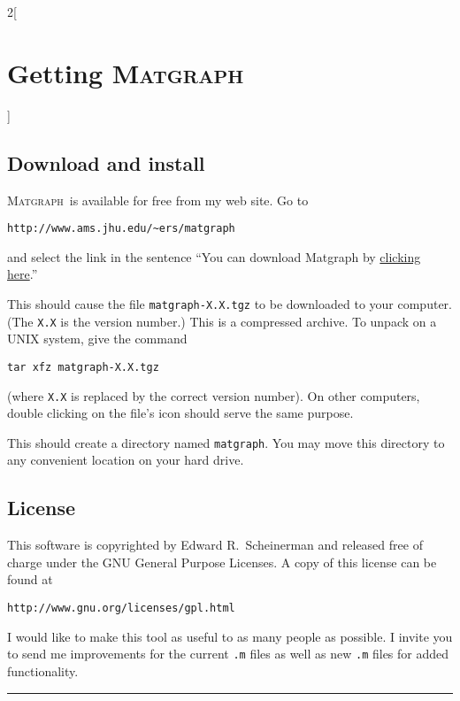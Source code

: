 \documentclass{amsart}
\newcommand\matgraph{\textsc{Matgraph}}
\begin{document}
\begin{multicols}{2}[\section{Getting \matgraph}]
\label{sect:getting}

\subsection{Download and install}

\matgraph\ is available for free from my web site. Go to
\begin{verbatim}
http://www.ams.jhu.edu/~ers/matgraph
\end{verbatim}
and select the link in the sentence
``You can download Matgraph by \underline{clicking here}.''

This should cause the file \verb|matgraph-X.X.tgz| to be downloaded to
your computer. (The \verb|X.X| is the version number.) This is a
compressed archive. To unpack on a UNIX system, give the command
\begin{verbatim}
tar xfz matgraph-X.X.tgz
\end{verbatim}
(where \verb|X.X| is replaced by the correct version number). On other
computers, double clicking on the file's icon should serve the same
purpose.

This should create a directory named \verb|matgraph|. You may move
this directory to any convenient location on your hard drive.  




\subsection{License}

This software is copyrighted by Edward R.~Scheinerman and released
free of charge under the GNU General Purpose Licenses. A copy of this
license can be found at
\begin{verbatim}
http://www.gnu.org/licenses/gpl.html
\end{verbatim}

I would like to make this tool as useful to as many people as
possible. I invite you to send me improvements for the current
\verb|.m| files as well as new \verb|.m| files for added
functionality.



\end{multicols}
\hrule
\end{document}
